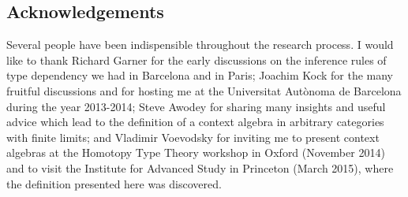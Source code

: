\subsection*{Acknowledgements}
Several people have been indispensible throughout the research process.
I would like to thank 
Richard Garner for the early discussions on the inference rules of type 
dependency we had in Barcelona and in Paris; 
Joachim Kock for the many fruitful discussions and for hosting me at the Universitat
Aut\`onoma de Barcelona during the year 2013-2014;
Steve Awodey for sharing many insights and useful advice which lead to the
definition of a context algebra in arbitrary categories with finite limits;
and Vladimir Voevodsky for inviting me to present context algebras at the Homotopy Type
Theory workshop in Oxford (November 2014) and to visit the Institute for Advanced 
Study in Princeton (March 2015), where the definition presented here was
discovered.
